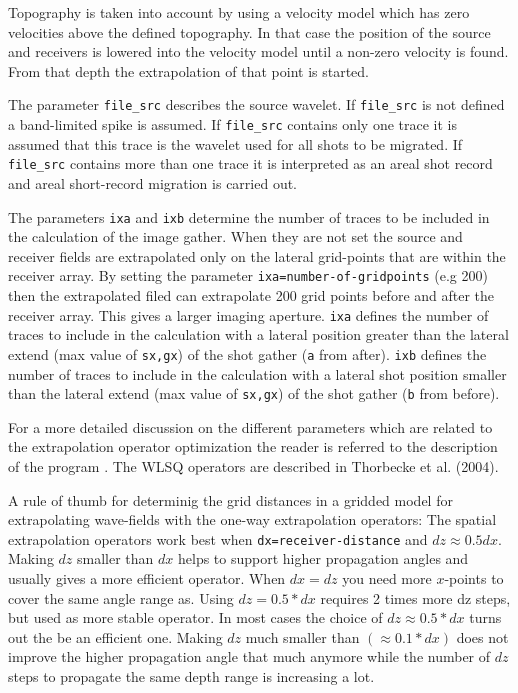 Topography is taken into account by using a velocity model which has zero velocities above the defined topography. In that case the position of the source and receivers is lowered into the velocity model until a non-zero velocity is found. From that depth the extrapolation of that point is started. 

The parameter {\tt file\_src} describes the source wavelet. If {\tt file\_src} is not defined a band-limited spike is assumed. If {\tt file\_src} contains only one trace it is assumed that this trace is the wavelet used for all shots to be migrated. If {\tt file\_src} contains more than one trace it is interpreted as an areal shot record and areal short-record migration is carried out. 

The parameters {\tt ixa} and {\tt ixb} determine the number of traces to be included in the calculation of the image gather. When they are not set the source and receiver fields are extrapolated only on the lateral grid-points that are within the receiver array. By setting the parameter {\tt ixa=number-of-gridpoints} (e.g 200) then the extrapolated filed can extrapolate 200 grid points before and after the receiver array. This gives a larger imaging aperture. {\tt ixa} defines the number of traces to include in the calculation with a lateral position greater than the lateral extend (max value of {\tt sx,gx}) of the shot gather ({\tt a} from after). 
{\tt ixb} defines the number of traces to include in the calculation with a lateral shot position smaller than the lateral extend (max value of {\tt sx,gx}) of the shot gather ({\tt b} from before).


For a more detailed discussion on the different parameters which are related to the extrapolation operator optimization the reader is referred to the description of the program . The WLSQ operators are described in Thorbecke et al. (2004).


A rule of thumb for determinig the grid distances in a gridded model for extrapolating wave-fields with the one-way extrapolation operators:  The spatial extrapolation operators work best when {\tt dx=receiver-distance} and $dz \approx 0.5dx$. Making $dz$ smaller than $dx$ helps to support higher propagation angles and usually gives a more efficient operator. When $dx=dz$ you need more $x$-points to cover the same angle range as. Using $dz=0.5*dx$ requires 2 times more dz steps, but used as more stable operator. In most cases the choice of $dz \approx 0.5*dx$ turns out the be an efficient one. Making $dz$ much smaller than $(\approx 0.1*dx)$ does not improve the higher propagation angle that much anymore while the number of $dz$ steps to propagate the same depth range is increasing a lot.

